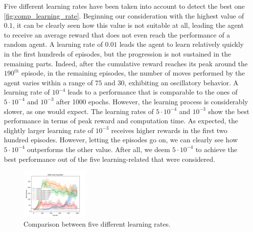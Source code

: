 \documentclass{article}
\begin{document}
Five different learning rates have been taken into account to detect the best one \autoref{fig:comp_learning_rate}. 
Beginning our consideration with the highest value of $0.1$, it can be clearly seen how this value is not suitable at all, 
leading the agent to receive an average reward that does not even reach the performance of a random agent. 
A learning rate of $0.01$ leads the agent to learn relatively quickly in the first hundreds of episodes, 
but the progression is not sustained in the remaining parts. 
Indeed, after the cumulative reward reaches its peak around the $190^{th}$ episode, in the remaining episodes, the number of moves performed by the agent varies within a range of $75$ and $30$, exhibiting an oscillatory behavior. 
A learning rate of $10^{-4}$ leads to a performance that is comparable to the ones of $5 \cdot 10^{-4}$ and $10^{-3}$ after 1000 epochs. 
However, the learning process is considerably slower, as one would expect.
The learning rates of $5 \cdot 10^{-4}$ and $10^{-3}$ show the best performance in terms of peak reward and computation time. 
As expected, the slightly larger learning rate of $10^{-3}$ 
receives higher rewards in the first two hundred episodes. 
However, letting the episodes go on, we can clearly see how $5 \cdot 10^{-4}$ outperforms the other value.
After all, we deem $5 \cdot 10^{-4}$ to achieve the best performance out of the five learning-related that were considered.

\begin{figure}[ht!]
   \centering
   \includegraphics[width=0.3\textwidth]{assets/fig_hp/learning_rate.png}
   \caption{Comparison between five different learning rates. 
   }
   \label{fig:comp_learning_rate}
\end{figure}
 
\end{document}
